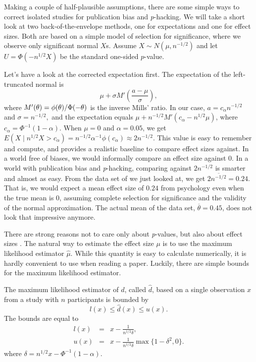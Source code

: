 Making a couple of half-plausible assumptions, there are some simple ways to correct isolated studies for publication bias and \emph{p}-hacking. We will take a short look at two back-of-the-envelope methods, one for expectations and one for effect sizes. Both are based on a simple model of selection for significance, where we observe only significant normal $X$s. Assume $X\sim N(\mu,n^{-1/2})$ and let $U=\Phi(-n^{1/2}X)$ be the standard one-sided $p$-value. 

Let's have a look at the corrected expectation first. The expectation of the left-truncated normal is \parencite[Section 10.1]{Johnson1994-ag}
\begin{equation}
\mu+\sigma M'\left(\frac{a-\mu}{\sigma}\right),\label{eq:mean of truncated normal}
\end{equation}
where
$M'(\text{\ensuremath{\theta}})=\phi(\text{\ensuremath{\theta}})/\Phi(-\text{\ensuremath{\theta}})$
is the inverse Mills' ratio. 
In our case, $a=c_{\alpha}n^{-1/2}$ and $\sigma=n^{-1/2},$ and the expectation equals $\mu+n^{-1/2}M'(c_{\alpha}-n^{1/2}\mu)$, where $c_\alpha = \Phi^{-1}(1-\alpha)$. When
$\mu=0$ and $\alpha=0.05$, we get $E(X\mid n^{1/2}X>c_{\alpha})=n^{-1/2}\alpha^{-1}\phi(c_{\alpha})\approx2n^{-1/2}.$
This value is easy to remember and compute, and provides a realistic baseline to compare effect sizes against. In a world free of biases, we would informally compare an effect size against $0$. In a world with publication bias and \emph{p}-hacking, comparing against $2n^{-1/2}$ is smarter and almost as easy. From the data set of \textcite{Motyl2017-dx} we just looked at, we get $2\overline{n^{-1/2}}=0.24$. That is, we would expect a mean effect size of $0.24$ from psychology even when the true mean is $0$, assuming complete selection for significance and the validity of the normal approximation. The actual mean of the data set, $\overline{\theta}=0.45$, does not look that impressive anymore.

There are strong reasons not to care only about \emph{p}-values, but also about effect sizes . The natural way to
estimate the effect size $\mu$ is to use the maximum likelihood estimator $\hat{\mu}$. While this quantity is easy to calculate numerically, it is hardly convenient to use when reading a paper. Luckily, there are simple bounds for the maximum likelihood estimator.
\begin{proposition}
\label{prop:maximum likelihood bounds}The maximum likelihood estimator of $d$, called $\hat{d}$, based on a single observation $x$ from a study with $n$ participants is bounded by 
\[
l(x)\leq\hat{d}(x)\leq u(x).
\]
The bounds are equal to
\begin{eqnarray}
l(x) & = & x-\frac{1}{n^{1/2}\delta},\label{eq:lower bound}\\
u(x) & = & x-\frac{1}{n^{1/2}\delta}\max\{1-\delta^{2},0\}.\label{eq:upper bound}
\end{eqnarray}
where $\delta=n^{1/2}x-\Phi^{-1}(1-\alpha)$.
\end{proposition}

